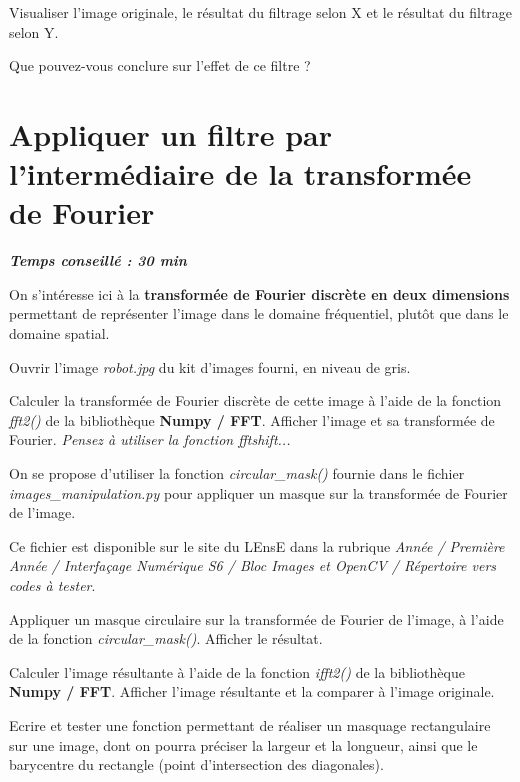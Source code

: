 \documentclass[a4paper,11pt,titlepage]{article} %
\begin{document}
\Manip Visualiser l'image originale, le résultat du filtrage selon X et le résultat du filtrage selon Y.

\Quest Que pouvez-vous conclure sur l'effet de ce filtre ?

\section{Appliquer un filtre par l'intermédiaire de la transformée de Fourier}

\begin{center} \textbf{\textit{Temps conseillé : 30 min}} \end{center}

On s'intéresse ici à la \textbf{transformée de Fourier discrète en deux dimensions} permettant de représenter l'image dans le domaine fréquentiel, plutôt que dans le domaine spatial.

\Manip Ouvrir l'image \textsl{robot.jpg} du kit d'images fourni, en niveau de gris.

\Manip Calculer la transformée de Fourier discrète de cette image à l'aide de la fonction \textsl{fft2()} de la bibliothèque \textbf{Numpy / FFT}. Afficher l'image et sa transformée de Fourier. \textit{Pensez à utiliser la fonction fftshift...}

\medskip

On se propose d'utiliser la fonction \textsl{circular\_mask()} fournie dans le fichier \textsl{images\_manipulation.py} pour appliquer un masque sur la transformée de Fourier de l'image. 

Ce fichier est disponible sur le site du LEnsE dans la rubrique \textit{Année / Première Année / Interfaçage Numérique S6 / Bloc Images et OpenCV / Répertoire vers codes à tester}.

\Manip Appliquer un masque circulaire sur la transformée de Fourier de l'image, à l'aide de la fonction \textsl{circular\_mask()}. Afficher le résultat.

\Manip Calculer l'image résultante à l'aide de la fonction \textit{ifft2()} de la bibliothèque \textbf{Numpy / FFT}. Afficher l'image résultante et la comparer à l'image originale.

\medskip

\Manip Ecrire et tester une fonction permettant de réaliser un masquage rectangulaire sur une image, dont on pourra préciser la largeur et la longueur, ainsi que le barycentre du rectangle (point d'intersection des diagonales).
\end{document}
